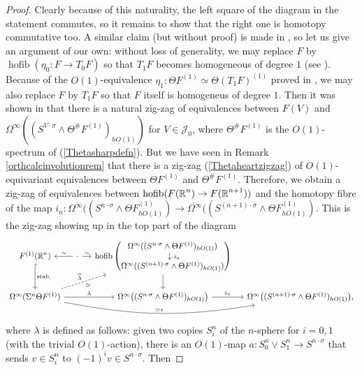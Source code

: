 \documentclass[a4paper, oneside]{amsart}
\newcommand{\hofib}{\operatorname{hofib}}
\newcommand{\1}{\mathds{1}}
\theoremstyle{remark}
\theoremstyle{definition}
\newcommand{\R}{{\scaleobj{0.97}{\mathbb{R}}}}
\numberwithin{equation}{section}
\begin{document}
\begin{proof}
Clearly because of this naturality, the left square of the diagram in the statement commutes, so it remains to show that the right one is homotopy commutative too. A similar claim (but without proof) is made in \cite[Ex. 10.1]{WeissOrthCalc}, so let us give an argument of our own: without loss of generality, we may replace $F$ by $\hofib(\eta_0:F\to T_0 F)$ so that $T_1 F$ becomes homogeneous of degree $1$ (see \cite[Defn. 7.1]{WeissOrthCalc}). Because of the $O(1)$-equivalence $\eta_1: \Theta F^{(1)}\simeq \Theta(T_1F)^{(1)}$ proved in \cite[Thm. 6.3(bis)]{WeissOrthCalc}, we may also replace $F$ by $T_1F$ so that $F$ itself is homogeneus of degree $1$. Then it was shown in \cite[Thm. 7.3]{WeissOrthCalc} that there is a natural zig-zag of equivalences between $F(V)$ and $\Omega^\infty((S^{V\cdot\sigma}\wedge \Theta^\#F^{(1)})_{hO(1)})$ for $V\in \mathcal J_0$, where $\Theta^\#F^{(1)}$ is the $O(1)$-spectrum of (\ref{Thetasharpdefn}). But we have seen in Remark \ref{orthcalcinvolutionrem} that there is a zig-zag (\ref{Thetaheartzigzag}) of $O(1)$-equivariant equivalences between $\Theta F^{(1)}$ and $\Theta^\#F^{(1)}$. Therefore, we obtain a zig-zag of equivalences between $\hofib(F(\R^n)\to F(\R^{n+1}))$ and the homotopy fibre of the map $i_n: \Omega^\infty((S^{n\cdot\sigma}\wedge\Theta F^{(1)}_{hO(1)})\to \Omega^\infty((S^{(n+1)\cdot\sigma}\wedge\Theta F^{(1)}_{hO(1)})$. This is the zig-zag showing up in the top part of the diagram
\begin{equation}\label{liftproofdiagram}
\begin{tikzcd}[column sep = 11pt]
  F^{(1)}(\R^n)\dar[hook, "\mathrm{stab.}"]&\cdot\lar["\sim"']\rar["\sim"]&\hofib\begin{pmatrix}\Omega^\infty((S^{n\cdot\sigma}\wedge\Theta F^{(1)})_{hO(1)})\\ \hspace{3pt}\downarrow \scalebox{0.8}{$i_n$}\\ \Omega^\infty((S^{(n+1)\cdot\sigma}\wedge\Theta F^{(1)})_{hO(1)})\end{pmatrix}\dar&\\
  \Omega^\infty(\Sigma^n\Theta F^{(1)})\ar[rrr, "\simeq *", bend right=10]\ar[rr,"\lambda"]\ar[urr,dashed, "\widehat{\lambda}", "\simeq"'] &&\Omega^\infty\big((S^{n\cdot\sigma}\wedge\Theta F^{(1)})_{hO(1)}\big)\rar["i_n"] & \Omega^\infty\big((S^{(n+1)\cdot\sigma}\wedge\Theta F^{(1)})_{hO(1)}\big),
\end{tikzcd}
\end{equation}
where $\lambda$ is defined as follows: given two copies $S^n_i$ of the $n$-sphere for $i=0,1$ (with the trivial $O(1)$-action), there is an $O(1)$-map $a: S^n_0\vee S^n_1\to S^{n\cdot\sigma}$ that sends $v\in S^n_i$ to $(-1)^{i}v\in S^{n\cdot\sigma}$. Then  

\end{proof}
\end{document}
